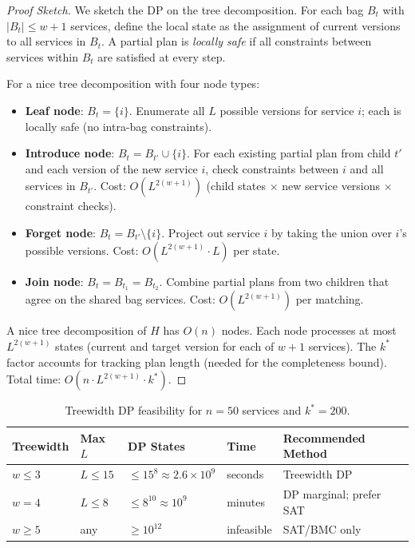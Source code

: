 \documentclass[10pt,twocolumn]{article}
\begin{document}
\begin{proof}[Proof Sketch]
We sketch the DP on the tree decomposition. For each bag $B_t$ with $|B_t| \leq w+1$ services, define the local state as the assignment of current versions to all services in $B_t$. A partial plan is \emph{locally safe} if all constraints between services within $B_t$ are satisfied at every step.

For a nice tree decomposition with four node types:
\begin{itemize}
\item \textbf{Leaf node}: $B_t = \{i\}$. Enumerate all $L$ possible versions for service $i$; each is locally safe (no intra-bag constraints).
\item \textbf{Introduce node}: $B_t = B_{t'} \cup \{i\}$. For each existing partial plan from child $t'$ and each version of the new service $i$, check constraints between $i$ and all services in $B_{t'}$. Cost: $O(L^{2(w+1)})$ (child states $\times$ new service versions $\times$ constraint checks).
\item \textbf{Forget node}: $B_t = B_{t'} \setminus \{i\}$. Project out service $i$ by taking the union over $i$'s possible versions. Cost: $O(L^{2(w+1)} \cdot L)$ per state.
\item \textbf{Join node}: $B_t = B_{t_1} = B_{t_2}$. Combine partial plans from two children that agree on the shared bag services. Cost: $O(L^{2(w+1)})$ per matching.
\end{itemize}

A nice tree decomposition of $H$ has $O(n)$ nodes. Each node processes at most $L^{2(w+1)}$ states (current and target version for each of $w+1$ services). The $k^*$ factor accounts for tracking plan length (needed for the completeness bound). Total time: $O(n \cdot L^{2(w+1)} \cdot k^*)$.
\end{proof}

\begin{table}[t]
\centering
\caption{Treewidth DP feasibility for $n=50$ services and $k^*=200$.}
\label{tab:treewidth-feasibility}
\begin{tabular}{@{}lllll@{}}
\toprule
\textbf{Treewidth} & \textbf{Max $L$} & \textbf{DP States} & \textbf{Time} & \textbf{Recommended Method} \\
\midrule
$w \leq 3$ & $L \leq 15$ & $\leq 15^8 \approx 2.6 \times 10^9$ & seconds & Treewidth DP \\
$w = 4$ & $L \leq 8$ & $\leq 8^{10} \approx 10^9$ & minutes & DP marginal; prefer SAT \\
$w \geq 5$ & any & $\geq 10^{12}$ & infeasible & SAT/BMC only \\
\bottomrule
\end{tabular}
\end{table}
\end{document}
